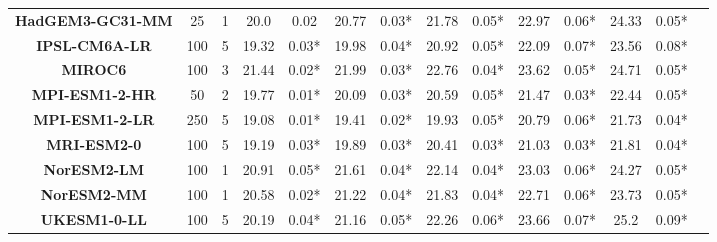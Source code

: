 \begin{tabular}{|c|c|c|c|c|c|c|c|c|c|c|c|c|c|}
\textbf{HadGEM3-GC31-MM } &   25 &      1 &   20.0 &   0.02 &  20.77 &  0.03* &  21.78 &  0.05* &  22.97 &  0.06* &  24.33 &  0.05* \\
\textbf{IPSL-CM6A-LR    } &  100 &      5 &  19.32 &  0.03* &  19.98 &  0.04* &  20.92 &  0.05* &  22.09 &  0.07* &  23.56 &  0.08* \\
\textbf{MIROC6          } &  100 &      3 &  21.44 &  0.02* &  21.99 &  0.03* &  22.76 &  0.04* &  23.62 &  0.05* &  24.71 &  0.05* \\
\textbf{MPI-ESM1-2-HR   } &   50 &      2 &  19.77 &  0.01* &  20.09 &  0.03* &  20.59 &  0.05* &  21.47 &  0.03* &  22.44 &  0.05* \\
\textbf{MPI-ESM1-2-LR   } &  250 &      5 &  19.08 &  0.01* &  19.41 &  0.02* &  19.93 &  0.05* &  20.79 &  0.06* &  21.73 &  0.04* \\
\textbf{MRI-ESM2-0      } &  100 &      5 &  19.19 &  0.03* &  19.89 &  0.03* &  20.41 &  0.03* &  21.03 &  0.03* &  21.81 &  0.04* \\
\textbf{NorESM2-LM      } &  100 &      1 &  20.91 &  0.05* &  21.61 &  0.04* &  22.14 &  0.04* &  23.03 &  0.06* &  24.27 &  0.05* \\
\textbf{NorESM2-MM      } &  100 &      1 &  20.58 &  0.02* &  21.22 &  0.04* &  21.83 &  0.04* &  22.71 &  0.06* &  23.73 &  0.05* \\
\textbf{UKESM1-0-LL     } &  100 &      5 &  20.19 &  0.04* &  21.16 &  0.05* &  22.26 &  0.06* &  23.66 &  0.07* &   25.2 &  0.09* \\
\bottomrule
\end{tabular}
